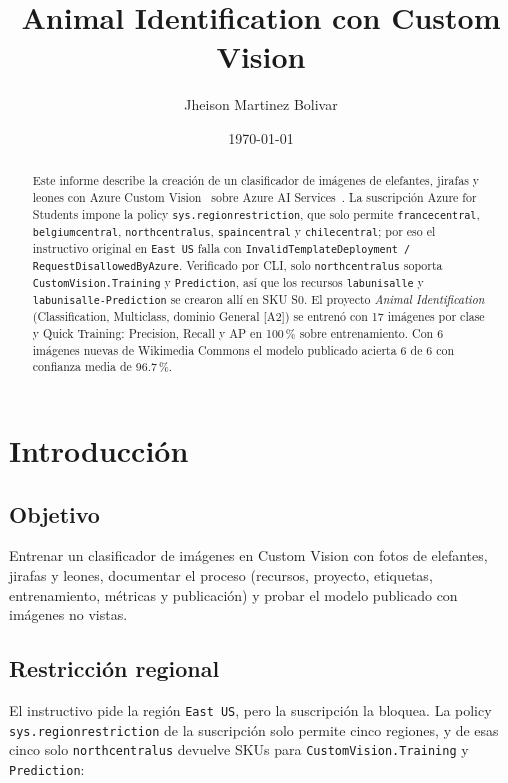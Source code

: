 \documentclass[a4paper,11pt]{article}
\title{Animal Identification con Custom Vision}
\author{Jheison Martinez Bolivar}
\date{\today}
\begin{document}
  \maketitle

  \begin{abstract}
    Este informe describe la creaci\'on de un clasificador de im\'agenes de
    elefantes, jirafas y leones con Azure Custom Vision~\cite{microsoft_customvision2024}
    sobre Azure AI Services~\cite{microsoft_cognitiveservices2024}. La
    suscripci\'on Azure for Students impone la policy
    \texttt{sys.regionrestriction}, que solo permite \texttt{francecentral},
    \texttt{belgiumcentral}, \texttt{northcentralus}, \texttt{spaincentral} y
    \texttt{chilecentral}; por eso el instructivo original en \texttt{East US}
    falla con \texttt{InvalidTemplateDeployment / RequestDisallowedByAzure}.
    Verificado por CLI, solo \texttt{northcentralus} soporta
    \texttt{CustomVision.Training} y \texttt{Prediction}, as\'i que los recursos
    \texttt{labunisalle} y \texttt{labunisalle-Prediction} se crearon all\'i en
    SKU S0. El proyecto \textit{Animal Identification} (Classification,
    Multiclass, dominio General [A2]) se entren\'o con 17 im\'agenes por clase y
    Quick Training: Precision, Recall y AP en 100\,\% sobre entrenamiento. Con 6
    im\'agenes nuevas de Wikimedia Commons el modelo publicado acierta 6 de 6
    con confianza media de 96.7\,\%.
  \end{abstract}

  \section{Introducci\'on}
  \subsection{Objetivo}
  Entrenar un clasificador de im\'agenes en Custom Vision con fotos de
  elefantes, jirafas y leones, documentar el proceso (recursos, proyecto,
  etiquetas, entrenamiento, m\'etricas y publicaci\'on) y probar el modelo
  publicado con im\'agenes no vistas.

  \subsection{Restricci\'on regional}
  El instructivo pide la regi\'on \texttt{East US}, pero la suscripci\'on la
  bloquea. La policy \texttt{sys.regionrestriction} de la suscripci\'on solo
  permite cinco regiones, y de esas cinco solo \texttt{northcentralus} devuelve
  SKUs para \texttt{CustomVision.Training} y \texttt{Prediction}:
\end{document}
